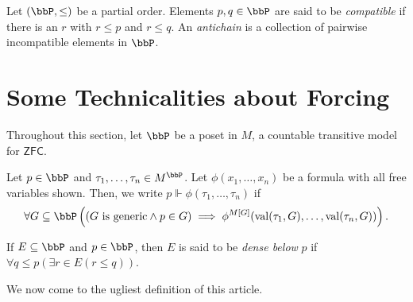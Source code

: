 \begin{definition}
    Let $(\bbP, \le)$ be a partial order. Elements $p,q\in\bbP$ are said to be \emph{compatible} if there is an $r$ with $r\le p$ and $r\le q$. An \emph{antichain} is a collection of pairwise incompatible elements in $\bbP$.
\end{definition}

\section{Some Technicalities about Forcing}

Throughout this section, let $\bbP$ be a poset in $M$, a countable transitive model for $\mathsf{ZFC}$.


\begin{definition}[Forcing]
    Let $p\in\bbP$ and $\tau_1,\dots,\tau_n\in M^\bbP$. Let $\phi(x_1,\dots,x_n)$ be a formula with all free variables shown. Then, we write $p\Vdash\phi(\tau_1,\dots,\tau_n)$ if 
    \begin{equation*}
        \forall G\subseteq\bbP\left((G\text{ is generic}\wedge p\in G)\implies\phi^{M[G]}(\val(\tau_1, G),\dots,\val(\tau_n, G))\right).
    \end{equation*}
\end{definition}

\begin{definition}
    If $E\subseteq\bbP$ and $p\in\bbP$, then $E$ is said to be \emph{dense below} $p$ if $\forall q\le p\left(\exists r\in E(r\le q)\right)$.
\end{definition}

We now come to the ugliest definition of this article.

